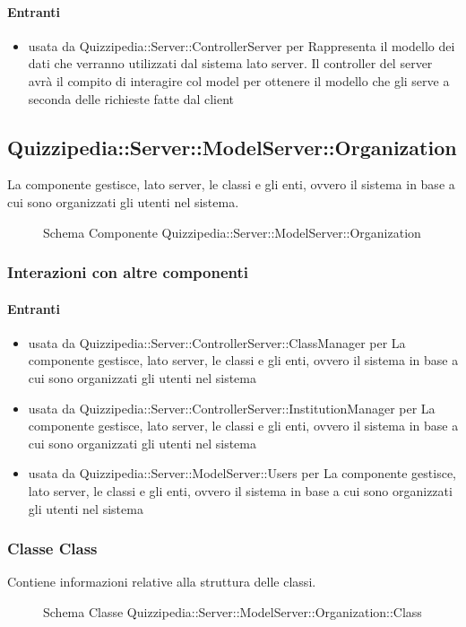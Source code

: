 \paragraph{Entranti}
\begin{itemize}
\item usata da Quizzipedia::Server::ControllerServer per Rappresenta il modello dei dati che verranno utilizzati dal sistema lato server. 
Il controller del server avrà il compito di interagire col model per ottenere il modello che gli serve a seconda delle richieste fatte dal client
\end{itemize}
\subsection{Quizzipedia::Server::ModelServer::Organization}
La componente gestisce, lato server, le classi e gli enti, ovvero il sistema in base a cui sono organizzati gli utenti nel sistema.
\begin{figure}[H]
\centering
\noindent{}
\caption[Schema Componente Quizzipedia::Server::ModelServer::Organization]{Schema Componente Quizzipedia::Server::ModelServer::Organization}
\end{figure}
\subsubsection{Interazioni con altre componenti}
\paragraph{Entranti}
\begin{itemize}
\item usata da Quizzipedia::Server::ControllerServer::ClassManager per La componente gestisce, lato server, le classi e gli enti, ovvero il sistema in base a cui sono organizzati gli utenti nel sistema
\item usata da Quizzipedia::Server::ControllerServer::InstitutionManager per La componente gestisce, lato server, le classi e gli enti, ovvero il sistema in base a cui sono organizzati gli utenti nel sistema
\item usata da Quizzipedia::Server::ModelServer::Users per La componente gestisce, lato server, le classi e gli enti, ovvero il sistema in base a cui sono organizzati gli utenti nel sistema
\end{itemize}
\subsubsection{Classe Class}
Contiene informazioni relative alla struttura delle classi.
\begin{figure}[H]
\centering
\noindent{}
\caption[Schema Classe Class]{Schema Classe Quizzipedia::Server::ModelServer::Organization::Class}
\end{figure}
